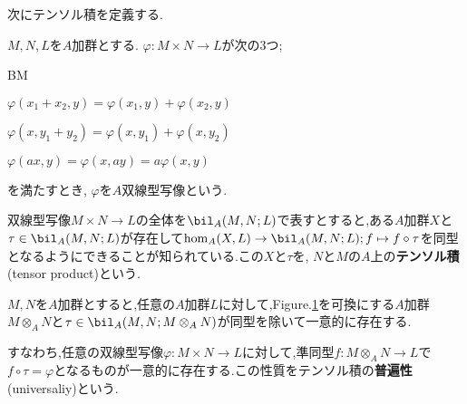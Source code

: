 次にテンソル積を定義する.
\begin{defi}[双線型写像]
	$M,N,L$を$A$加群とする. $\varphi:M\times N\to L$が次の3つ;
	\begin{defiterm}{BM}
		\item $\varphi(x_1+x_2,y)=\varphi(x_1,y)+\varphi(x_2,y)$
		\item $\varphi(x,y_1+y_2)=\varphi(x,y_1)+\varphi(x,y_2)$
		\item $\varphi(ax,y)=\varphi(x,ay)=a\varphi(x,y)$
	\end{defiterm}
	を満たすとき, $\varphi$を$A$双線型写像という.
\end{defi}

双線型写像$M\times N\to L$の全体を$\bil_A(M,N;L)$で表すとすると,ある$A$加群$X$と$\tau\in\bil_A(M,N;L)$が存在して$\hom_A(X,L)\to\bil_A(M,N;L);f\mapsto f\circ\tau$を同型となるようにできることが知られている.この$X$と$\tau$を, $N$と$M$の$A$上の\textbf{テンソル積}(tensor product)という.%

\begin{thm}[テンソル積]
	$M,N$を$A$加群とすると,任意の$A$加群$L$に対して,Figure.\ref{fig:tensor}を可換にする$A$加群$M\otimes_A N$と$\tau\in\bil_A(M,N;M\otimes_AN)$が同型を除いて一意的に存在する.
\end{thm}

すなわち,任意の双線型写像$\varphi:M\times N\to L$に対して,準同型$f:M\otimes_AN\to L$で$f\circ\tau=\varphi$となるものが一意的に存在する.この性質をテンソル積の\textbf{普遍性}(universaliy)という.
\begin{figure}[H]
	\centering
	\caption{}\label{fig:tensor}
\end{figure}

